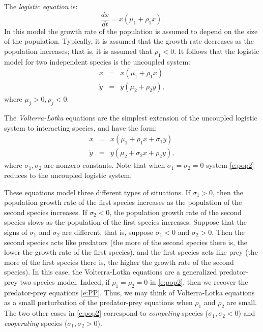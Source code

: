\documentclass{ximera}
\begin{document}
The {\em logistic equation\/}  is:
\[
\frac{dx}{dt} = x(\mu_1 + \rho_1x).
\]
In this model the growth rate of the population is assumed to
depend on the size of the population.  Typically, it is assumed
that the growth rate decreases as the population increases; that
is, it is assumed that $\rho_1 < 0$.  It follows that the
logistic model for two independent species is the uncoupled system:
\begin{eqnarray*}
\dot{x} & = & x(\mu_1 + \rho_1x) \\
\dot{y} & = & y(\mu_2 + \rho_2y),
\end{eqnarray*}
where $\mu_j>0,\rho_j<0$.

The {\em Volterra-Lotka\/} equations 
are the simplest extension
of the uncoupled logistic system to interacting species, and
have the form:
\begin{equation} \label{e:pop2}
\begin{array}{rcl}
\dot{x} & = & x(\mu_1 +   \rho_1x + \sigma_1y) \\
\dot{y} & = & y(\mu_2 + \sigma_2x +   \rho_2y),
\end{array}
\end{equation}
where $\sigma_1,\sigma_2$ are nonzero constants.  Note that when
$\sigma_1=\sigma_2=0$ system \eqref{e:pop2} reduces to the
uncoupled logistic system. 

These equations model three different types of situations.  If
$\sigma_1>0$, then the population growth rate of the first species 
increases as the population of the second species increases.  If
$\sigma_2<0$, the population growth rate of the second species
slows as the population of the first species increases.
Suppose that the signs of $\sigma_1$ and $\sigma_2$ are
different, that is, suppose $\sigma_1<0$ and $\sigma_2>0$.  Then
the second species acts like predators (the more of the second
species there is, the lower the growth rate of the first
species), and the first species acts like prey (the more of
the first species there is, the higher the growth rate of the
second species).  In this case, the Volterra-Lotka equations are
a generalized predator-prey two species model.  Indeed,
if $\rho_1=\rho_2=0$ in \eqref{e:pop2}, then we recover the
predator-prey equations \eqref{e:PP}.  Thus, we may think of
Volterra-Lotka equations as a small perturbation of the 
predator-prey equations when $\rho_1$ and $\rho_2$ are small.
The two other cases in \eqref{e:pop2} correspond to {\em competing\/} 
species ($\sigma_1,\sigma_2<0$) and 
{\em cooperating\/} species
($\sigma_1,\sigma_2>0$).
\end{document}
